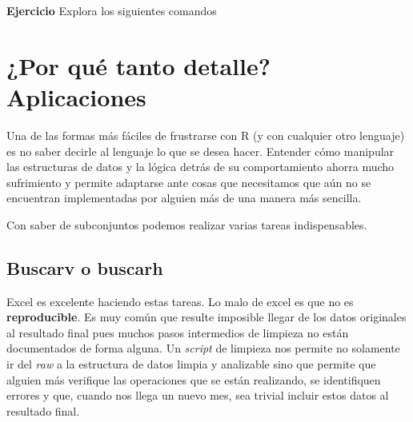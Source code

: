 \documentclass[]{article}
\newenvironment{Shaded}{\begin{snugshade}}{\end{snugshade}}
\newcommand{\KeywordTok}[1]{\textcolor[rgb]{0.13,0.29,0.53}{\textbf{{#1}}}}
\newcommand{\DecValTok}[1]{\textcolor[rgb]{0.00,0.00,0.81}{{#1}}}
\newcommand{\FloatTok}[1]{\textcolor[rgb]{0.00,0.00,0.81}{{#1}}}
\newcommand{\StringTok}[1]{\textcolor[rgb]{0.31,0.60,0.02}{{#1}}}
\newcommand{\NormalTok}[1]{{#1}}
\begin{document}
\textbf{Ejercicio} Explora los siguientes comandos

\begin{Shaded}
\end{Shaded}

\section{¿Por qué tanto detalle?
Aplicaciones}\label{por-que-tanto-detalle-aplicaciones}

Una de las formas más fáciles de frustrarse con R (y con cualquier otro
lenguaje) es no saber decirle al lenguaje lo que se desea hacer.
Entender cómo manipular las estructuras de datos y la lógica detrás de
su comportamiento ahorra mucho sufrimiento y permite adaptarse ante
cosas que necesitamos que aún no se encuentran implementadas por alguien
más de una manera más sencilla.

Con saber de subconjuntos podemos realizar varias tareas indispensables.

\subsection{Buscarv o buscarh}\label{buscarv-o-buscarh}

Excel es excelente haciendo estas tareas. Lo malo de excel es que no es
\textbf{reproducible}. Es muy común que resulte imposible llegar de los
datos originales al resultado final pues muchos pasos intermedios de
limpieza no están documentados de forma alguna. Un \emph{script} de
limpieza nos permite no solamente ir del \emph{raw} a la estructura de
datos limpia y analizable sino que permite que alguien más verifique las
operaciones que se están realizando, se identifiquen errores y que,
cuando nos llega un nuevo mes, sea trivial incluir estos datos al
resultado final.
\end{document}
